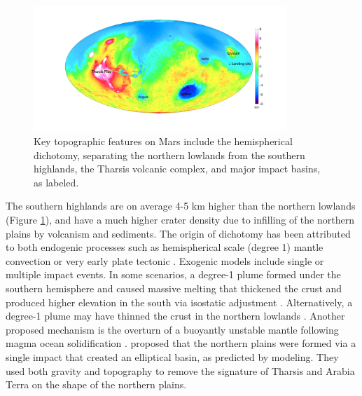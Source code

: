 \begin{figure}[h!]
\begin{center}
\includegraphics[width=0.85\textwidth]
{figures/Fig_2New.png}
\caption{Key topographic features on Mars include the hemispherical dichotomy, separating the northern lowlands from the southern highlands, the Tharsis volcanic complex, and major impact basins, as labeled.}
\label{fig:topo} 
\end{center}
\end{figure}

The southern highlands are on average 4-5 km higher than the northern lowlands (Figure \ref{fig:topo}), and have a much higher crater density due to infilling of the northern plains by volcanism and sediments. The origin of dichotomy has been attributed to both endogenic processes such as hemispherical scale (degree 1) mantle convection \citep{SCHUBERT1973,Wise1979a,Wise1979, Breuer1997, Breuer1998, Zhong2001} or very early plate tectonic \citep{Sleep1994}. Exogenic models include single \citep{Wilhelms1984} or multiple \citep{Frey1988} impact events. In some scenarios, a degree-1 plume formed under the southern hemisphere and caused massive melting that thickened the crust and produced higher elevation in the south via isostatic adjustment \citep{Zhong2001}.  Alternatively, a degree-1 plume may have thinned the crust in the northern lowlands \citep{Roberts2006}. Another proposed mechanism is the overturn of a buoyantly unstable mantle following magma ocean solidification \citep{Elkins-Tanton2008}. \citep{Andrews-Hanna2008} proposed that the northern plains were formed via a single impact that created an elliptical basin, as predicted by modeling\citep{Marinova2008}. They used both gravity and topography to remove the signature of Tharsis and Arabia Terra on the shape of the northern plains. 

